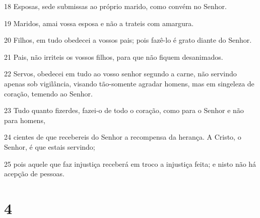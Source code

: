 \par 18 Esposas, sede submissas ao próprio marido, como convém no Senhor.
\par 19 Maridos, amai vossa esposa e não a trateis com amargura.
\par 20 Filhos, em tudo obedecei a vossos pais; pois fazê-lo é grato diante do Senhor.
\par 21 Pais, não irriteis os vossos filhos, para que não fiquem desanimados.
\par 22 Servos, obedecei em tudo ao vosso senhor segundo a carne, não servindo apenas sob vigilância, visando tão-somente agradar homens, mas em singeleza de coração, temendo ao Senhor.
\par 23 Tudo quanto fizerdes, fazei-o de todo o coração, como para o Senhor e não para homens,
\par 24 cientes de que recebereis do Senhor a recompensa da herança. A Cristo, o Senhor, é que estais servindo;
\par 25 pois aquele que faz injustiça receberá em troco a injustiça feita; e nisto não há acepção de pessoas.

\chapter{4}

